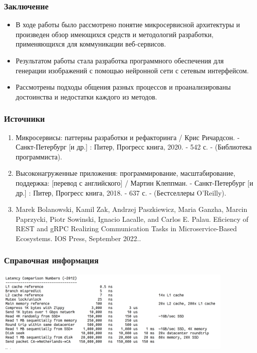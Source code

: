 \documentclass{beamer}
\begin{document}
\begin{frame}
	\frametitle{Заключение}
	\begin{itemize}
	\item В ходе работы было рассмотрено понятие микросервисной архитектуры и произведен обзор имеющихся средств и методологий разработки, применяющихся для коммуникации веб-сервисов.
	\item Результатом работы стала разработка программного обеспечения для генерации изображений с помощью нейронной сети с сетевым интерфейсом. 
	\item Рассмотрены подходы общения разных процессов и проанализированы достоинства и недостатки каждого из методов.
	\end{itemize}
\end{frame}

\begin{frame}
	\frametitle{Источники}
	\begin{enumerate}
		\item Микросервисы: паттерны разработки и рефакторинга / Крис Ричардсон. - Санкт-Петербург [и др.] : Питер, Прогресс книга, 2020. - 542 с. -  (Библиотека программиста). 
		\item Высоконагруженные приложения: программирование, масштабирование, поддержка: [перевод с английского] / Мартин Клеппман. - Санкт-Петербург [и др.] : Питер, Прогресс книга, 2018. - 637 с. -  (Бестселлеры O'Reilly). 
		\item Marek Bolanowski, Kamil Zak, Andrzej Paszkiewicz, Maria Ganzha, Marcin Paprzycki, Piotr Sowinski, Ignacio Lacalle, and Carlos E. Palau. Eficiency of REST and gRPC Realizing Communication Tasks in Microservice-Based Ecosystems. IOS Press, September 2022..
	\end{enumerate}
\end{frame}

\begin{frame}
	\frametitle{Справочная информация}
	\includegraphics[height=4cm]{img/latency.png}
\end{frame}
\end{document}
